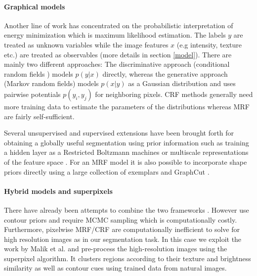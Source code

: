 \documentclass{article} %
\begin{document}
\paragraph{Graphical models}
Another line of work has concentrated on the probabilistic interpretation of energy minimization which is maximum likelihood estimation. The labels $y$ are treated as unknown variables while the image features $x$ (e.g intensity, texture etc.) are treated as observables (more details in section \ref{model}). There are mainly two different approaches: The discriminative approach (conditional random fields \cite{Lafferty01_CRFSeq, KaeSohn13_CRF}) models $p(y|x)$ directly, whereas the generative approach (Markov random fields) models $p(x|y)$ as a Gaussian distribution and uses pairwise potentials $p(y_i,y_j)$ for neighboring pixels. CRF methods generally need more training data to estimate the parameters of the distributions whereas MRF are fairly self-sufficient. 

Several unsupervised and supervised extensions have been brought forth for obtaining a globally useful segmentation using prior information such as training a hidden layer as a Restricted Boltzmann machines \cite{KaeSohn13_CRF} or multiscale representations of the feature space \cite{He04_MultiScale}. For an MRF model it is also possible to incorporate shape priors directly using a large collection of exemplars and GraphCut \cite{Lempitsky_BranchMin}. 

\paragraph{Hybrid models and superpixels}
There have already been attempts to combine the two frameworks \cite{Huang04_MRFDM, Schlesinger13}. However \cite{Huang04_MRFDM} use contour priors and \cite{Schlesinger13} require MCMC sampling which is computationally costly. Furthermore, pixelwise MRF/CRF are computationally inefficient to solve for high resolution images as in our segmentation task. In this case we exploit the work by Malik et al. \cite{Malik03_Superpixel} and pre-process the high-resolution images using the superpixel algorithm. It clusters regions according to their texture and brightness similarity as well as contour cues using trained data from natural images.
\end{document}
